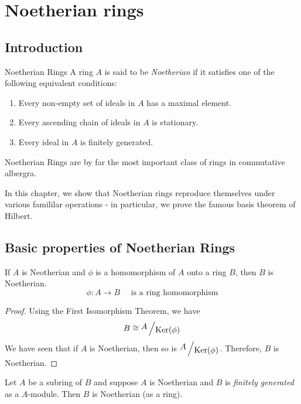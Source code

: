 \chapter{Noetherian rings} \label{ch:noetherian_rings}

\section{Introduction} \label{sec:noetherian_rings_intro}

\begin{definition}{Noetherian Rings}{}
	A ring \(A\) is said to be \emph{Noetherian} if it satisfies
	one of the following equivalent conditions:
	\begin{enumerate}
		\item Every non-empty set of ideals in \(A\) has a maximal element.
		\item Every ascending chain of ideals in \(A\) is stationary.
		\item Every ideal in \(A\) is finitely generated.
	\end{enumerate}
\end{definition}

Noetherian Rings are by far the most important class of rings in
commutative albergra.

In this chapter, we show that Noetherian rings reproduce themselves
under various famililar operations - in particular, we prove the
famous basis theorem of Hilbert.



\section{Basic properties of Noetherian Rings}
\label{sec:noetherian_rings_basic_properties}


\begin{proposition}{}{}
	If \(A\) is Neotherian and \(\phi\) is a homomorphism of \(A\)
	onto a ring \(B\), then \(B\) is Noetherian.
	\[
		\phi \colon A \to B \quad
		\text{ is a ring homomorphism}
	\]
\end{proposition}

\begin{proof}
	Using the First Isomorphism Theorem, we have
	\[
		B \cong \bigslant{A}{\Ker(\phi)}
	\]
	We have seen that if \(A\) is Noetherian, then so is
	\(\bigslant{A}{\Ker(\phi)}\).
	Therefore, \(B\) is Noetherian.
\end{proof}

\begin{proposition}{}{}
	Let \(A\) be a subring of \(B\) and suppose \(A\) is Noetherian and
	\(B\) is \emph{finitely generated} as a \(A\)-module.
	Then \(B\) is Noetherian (as a ring).
\end{proposition}

